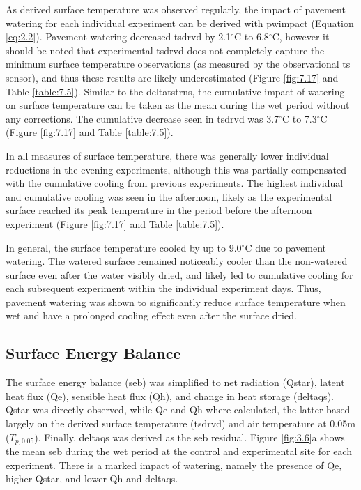 \documentclass[final,3p,times,authoryear]{elsarticle}
\begin{document}
As derived surface temperature was observed regularly, the impact of pavement watering for each individual experiment can be derived with \gls{pwimpact} (Equation \ref{eq:2.2}). Pavement watering decreased \gls{tsdrvd} by 2.1$^{\circ}$C to 6.8$^{\circ}$C, however it should be noted that experimental \gls{tsdrvd} does not completely capture the minimum surface temperature observations (as measured by the observational \gls{ts} sensor), and thus these results are likely underestimated (Figure \ref{fig:7.17} and Table \ref{table:7.5}). Similar to the \gls{deltatstrns}, the cumulative impact of watering on surface temperature can be taken as the mean during the wet period without any corrections. The cumulative decrease seen in \gls{tsdrvd} was 3.7$^{\circ}$C to 7.3$^{\circ}$C (Figure \ref{fig:7.17} and Table \ref{table:7.5}).

In all measures of surface temperature, there was generally lower individual reductions in the evening experiments, although this was partially compensated with the cumulative cooling from previous experiments. The highest individual and cumulative cooling was seen in the afternoon, likely as the experimental surface reached its peak temperature in the period before the afternoon experiment (Figure \ref{fig:7.17} and Table \ref{table:7.5}).

In general, the surface temperature cooled by up to 9.0$^{\circ}$C due to pavement watering. The watered surface remained noticeably cooler than the non-watered surface even after the water visibly dried, and likely led to cumulative cooling for each subsequent experiment within the individual experiment days. Thus, pavement watering was shown to significantly reduce surface temperature when wet and have a prolonged cooling effect even after the surface dried.

\subsection{Surface Energy Balance}\label{sec:discussion3.4}

The surface energy balance (\gls{seb}) was simplified to net radiation (\gls{Qstar}), latent heat flux (\gls{Qe}), sensible heat flux (\gls{Qh}), and change in heat storage (\gls{deltaqs}). \gls{Qstar} was directly observed, while \gls{Qe} and \gls{Qh} where calculated, the latter based largely on the derived surface temperature (\gls{tsdrvd}) and air temperature at 0.05m ($T_{p,0.05}$). Finally, \gls{deltaqs} was derived as the \gls{seb} residual. Figure \ref{fig:3.6}a shows the mean \gls{seb} during the wet period at the control and experimental site for each experiment. There is a marked impact of watering, namely the presence of \gls{Qe}, higher \gls{Qstar}, and lower \gls{Qh} and \gls{deltaqs}.
\end{document}
